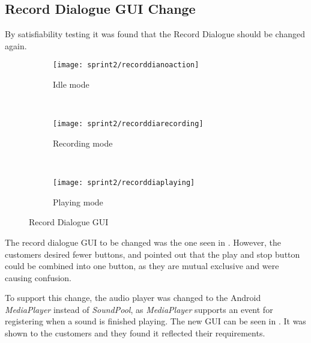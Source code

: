 \subsection{Record Dialogue GUI Change}
By satisfiability testing it was found that the Record Dialogue should be changed again.

\begin{figure}[h]
        \centering
        \begin{subfigure}[b]{0.3\textwidth}
                \texttt{[image: sprint2/recorddianoaction]}
                \caption{Idle mode}
                \label{fig:recordnoaction}
        \end{subfigure}%
        ~ %
        \begin{subfigure}[b]{0.3\textwidth}
                \texttt{[image: sprint2/recorddiarecording]}
                \caption{Recording mode}
                \label{fig:recordrecording}
        \end{subfigure}
        ~ %
        \begin{subfigure}[b]{0.3\textwidth}
                \texttt{[image: sprint2/recorddiaplaying]}
                \caption{Playing mode}
                \label{fig:recordplaying}
        \end{subfigure}
        \caption{Record Dialogue GUI}\label{fig:recorddia}
\end{figure}

The record dialogue GUI to be changed was the one seen in .
However, the customers desired fewer buttons, and pointed out that the play and stop button could be combined into one button, as they are mutual exclusive and were causing confusion.

To support this change, the audio player was changed to the Android \textit{MediaPlayer} instead of \textit{SoundPool}, as \textit{MediaPlayer} supports an event for registering when a sound is finished playing.
The new GUI can be seen in .
It was shown to the customers and they found it reflected their requirements.